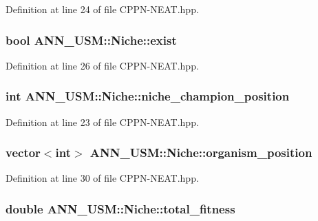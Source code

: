 Definition at line 24 of file C\-P\-P\-N-\/\-N\-E\-A\-T.\-hpp.

\hypertarget{class_a_n_n___u_s_m_1_1_niche_a29d8b9a3261b0eac3633dd909e048f64}{
\subsubsection[{exist}]{\setlength{\rightskip}{0pt plus 5cm}bool A\-N\-N\-\_\-\-U\-S\-M\-::\-Niche\-::exist}}\label{class_a_n_n___u_s_m_1_1_niche_a29d8b9a3261b0eac3633dd909e048f64}


Definition at line 26 of file C\-P\-P\-N-\/\-N\-E\-A\-T.\-hpp.

\hypertarget{class_a_n_n___u_s_m_1_1_niche_ab599fd202191fbdfc79ebea0e71133f6}{
\subsubsection[{niche\-\_\-champion\-\_\-position}]{\setlength{\rightskip}{0pt plus 5cm}int A\-N\-N\-\_\-\-U\-S\-M\-::\-Niche\-::niche\-\_\-champion\-\_\-position}}\label{class_a_n_n___u_s_m_1_1_niche_ab599fd202191fbdfc79ebea0e71133f6}


Definition at line 23 of file C\-P\-P\-N-\/\-N\-E\-A\-T.\-hpp.

\hypertarget{class_a_n_n___u_s_m_1_1_niche_ae25e893af8d8a91f5b666f4bc7d70edc}{
\subsubsection[{organism\-\_\-position}]{\setlength{\rightskip}{0pt plus 5cm}vector$<$int$>$ A\-N\-N\-\_\-\-U\-S\-M\-::\-Niche\-::organism\-\_\-position}}\label{class_a_n_n___u_s_m_1_1_niche_ae25e893af8d8a91f5b666f4bc7d70edc}


Definition at line 30 of file C\-P\-P\-N-\/\-N\-E\-A\-T.\-hpp.

\hypertarget{class_a_n_n___u_s_m_1_1_niche_a7be1952c8162924d1d0f95f6445f755b}{
\subsubsection[{total\-\_\-fitness}]{\setlength{\rightskip}{0pt plus 5cm}double A\-N\-N\-\_\-\-U\-S\-M\-::\-Niche\-::total\-\_\-fitness}}\label{class_a_n_n___u_s_m_1_1_niche_a7be1952c8162924d1d0f95f6445f755b}


